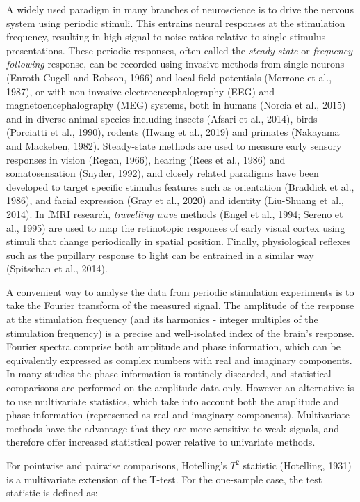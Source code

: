 \documentclass[]{article}
\begin{document}
A widely used paradigm in many branches of neuroscience is to drive the nervous system using periodic stimuli. This entrains neural responses at the stimulation frequency, resulting in high signal-to-noise ratios relative to single stimulus presentations. These periodic responses, often called the \emph{steady-state} or \emph{frequency following} response, can be recorded using invasive methods from single neurons (Enroth-Cugell and Robson, 1966) and local field potentials (Morrone et al., 1987), or with non-invasive electroencephalography (EEG) and magnetoencephalography (MEG) systems, both in humans (Norcia et al., 2015) and in diverse animal species including insects (Afsari et al., 2014), birds (Porciatti et al., 1990), rodents (Hwang et al., 2019) and primates (Nakayama and Mackeben, 1982). Steady-state methods are used to measure early sensory responses in vision (Regan, 1966), hearing (Rees et al., 1986) and somatosensation (Snyder, 1992), and closely related paradigms have been developed to target specific stimulus features such as orientation (Braddick et al., 1986), and facial expression (Gray et al., 2020) and identity (Liu-Shuang et al., 2014). In fMRI research, \emph{travelling wave} methods (Engel et al., 1994; Sereno et al., 1995) are used to map the retinotopic responses of early visual cortex using stimuli that change periodically in spatial position. Finally, physiological reflexes such as the pupillary response to light can be entrained in a similar way (Spitschan et al., 2014).

A convenient way to analyse the data from periodic stimulation experiments is to take the Fourier transform of the measured signal. The amplitude of the response at the stimulation frequency (and its harmonics - integer multiples of the stimulation frequency) is a precise and well-isolated index of the brain's response. Fourier spectra comprise both amplitude and phase information, which can be equivalently expressed as complex numbers with real and imaginary components. In many studies the phase information is routinely discarded, and statistical comparisons are performed on the amplitude data only. However an alternative is to use multivariate statistics, which take into account both the amplitude and phase information (represented as real and imaginary components). Multivariate methods have the advantage that they are more sensitive to weak signals, and therefore offer increased statistical power relative to univariate methods.

For pointwise and pairwise comparisons, Hotelling's \(T^2\) statistic (Hotelling, 1931) is a multivariate extension of the T-test. For the one-sample case, the test statistic is defined as:
\end{document}
